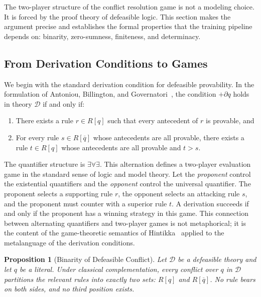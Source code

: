 \documentclass[11pt]{article}
\newtheorem{proposition}{Proposition}
\newcommand{\D}{\mathcal{D}}
\newcommand{\comp}[1]{\overline{#1}}
\begin{document}
The two-player structure of the conflict resolution game is not a modeling choice. It is forced by the proof theory of defeasible logic. This section makes the argument precise and establishes the formal properties that the training pipeline depends on: binarity, zero-sumness, finiteness, and determinacy.
 
\subsection{From Derivation Conditions to Games}
 
We begin with the standard derivation condition for defeasible provability. In the formulation of Antoniou, Billington, and Governatori~\cite{antoniou2001representation}, the condition $+\partial q$ holds in theory $\D$ if and only if:
 
\begin{enumerate}[nosep]
    \item There exists a rule $r \in R[q]$ such that every antecedent of $r$ is provable, and
    \item For every rule $s \in R[\comp{q}]$ whose antecedents are all provable, there exists a rule $t \in R[q]$ whose antecedents are all provable and $t > s$.
\end{enumerate}
 
The quantifier structure is $\exists \forall \exists$. This alternation defines a two-player evaluation game in the standard sense of logic and model theory. Let the \emph{proponent} control the existential quantifiers and the \emph{opponent} control the universal quantifier. The proponent selects a supporting rule $r$, the opponent selects an attacking rule $s$, and the proponent must counter with a superior rule $t$. A derivation succeeds if and only if the proponent has a winning strategy in this game. This connection between alternating quantifiers and two-player games is not metaphorical; it is the content of the game-theoretic semantics of Hintikka~\cite{hintikka1996principles} applied to the metalanguage of the derivation conditions.
 
\begin{proposition}[Binarity of Defeasible Conflict]\label{prop:binarity}
Let $\D$ be a defeasible theory and let $q$ be a literal. Under classical complementation, every conflict over $q$ in $\D$ partitions the relevant rules into exactly two sets: $R[q]$ and $R[\comp{q}]$. No rule bears on both sides, and no third position exists.
\end{proposition}
 
\end{document}
